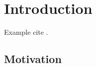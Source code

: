 \chapter{Introduction} \label{chap:intro}

\lipsum[1-1]
Example cite \cite{lee2020vector}.

\section{Motivation}

\lipsum[2-5]